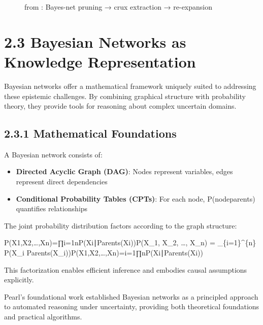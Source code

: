\documentclass[
  11pt,
  letterpaper,
]{book}
\providecommand{\tightlist}{%
  \setlength{\itemsep}{0pt}\setlength{\parskip}{0pt}}
\begin{document}
\begin{figure}
{}

\caption[Bayes-net pruning → crux extraction →
re-expansion]{\label{fig-bayesnet-crux-flow}from
\textcite{gruetzemacher2022}: Bayes-net pruning → crux extraction →
re-expansion}

\end{figure}%

\section{2.3 Bayesian Networks as Knowledge
Representation}\label{bayesian-networks-as-knowledge-representation}

Bayesian networks offer a mathematical framework uniquely suited to
addressing these epistemic challenges. By combining graphical structure
with probability theory, they provide tools for reasoning about complex
uncertain domains.

\subsection{2.3.1 Mathematical
Foundations}\label{mathematical-foundations}

A Bayesian network consists of:

\begin{itemize}
\tightlist
\item
  \textbf{Directed Acyclic Graph (DAG)}: Nodes represent variables,
  edges represent direct dependencies
\item
  \textbf{Conditional Probability Tables (CPTs)}: For each node,
  P(node\textbar parents) quantifies relationships
\end{itemize}

The joint probability distribution factors according to the graph
structure:

P(X1,X2,\ldots,Xn)=∏i=1nP(Xi∣Parents(Xi))P(X\_1, X\_2, \ldots, X\_n) =
\prod\_\{i=1\}\^{}\{n\} P(X\_i \textbar{}
Parents(X\_i))P(X1\hspace{0pt},X2\hspace{0pt},\ldots,Xn\hspace{0pt})=i=1∏n\hspace{0pt}P(Xi\hspace{0pt}∣Parents(Xi\hspace{0pt}))

This factorization enables efficient inference and embodies causal
assumptions explicitly.

Pearl's foundational work \textcite{pearl2014} established Bayesian
networks as a principled approach to automated reasoning under
uncertainty, providing both theoretical foundations and practical
algorithms.
\end{document}
